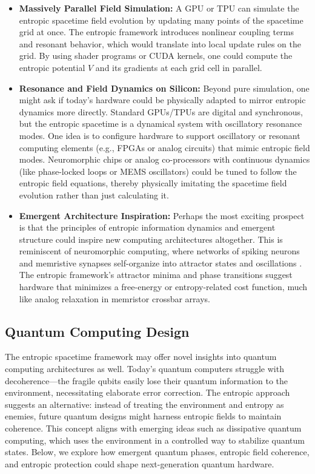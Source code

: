 \documentclass[11pt,a4paper]{article} %
\begin{document}
\begin{itemize}
  \item \textbf{Massively Parallel Field Simulation:} A GPU or TPU can simulate the entropic spacetime field evolution by updating many points of the spacetime grid at once. The entropic framework introduces nonlinear coupling terms and resonant behavior, which would translate into local update rules on the grid. By using shader programs or CUDA kernels, one could compute the entropic potential \(V\) and its gradients at each grid cell in parallel.
  
  \item \textbf{Resonance and Field Dynamics on Silicon:} Beyond pure simulation, one might ask if today’s hardware could be physically adapted to mirror entropic dynamics more directly. Standard GPUs/TPUs are digital and synchronous, but the entropic spacetime is a dynamical system with oscillatory resonance modes. One idea is to configure hardware to support oscillatory or resonant computing elements (e.g., FPGAs or analog circuits) that mimic entropic field modes. Neuromorphic chips or analog co-processors with continuous dynamics (like phase-locked loops or MEMS oscillators) could be tuned to follow the entropic field equations, thereby physically imitating the spacetime field evolution rather than just calculating it.
  
  \item \textbf{Emergent Architecture Inspiration:} Perhaps the most exciting prospect is that the principles of entropic information dynamics and emergent structure could inspire new computing architectures altogether. This is reminiscent of neuromorphic computing, where networks of spiking neurons and memristive synapses self-organize into attractor states and oscillations \cite{lanl-synapses}. The entropic framework’s attractor minima and phase transitions suggest hardware that minimizes a free-energy or entropy-related cost function, much like analog relaxation in memristor crossbar arrays.
\end{itemize}

\subsection{Quantum Computing Design}
The entropic spacetime framework may offer novel insights into quantum computing architectures as well. Today’s quantum computers struggle with decoherence—the fragile qubits easily lose their quantum information to the environment, necessitating elaborate error correction. The entropic approach suggests an alternative: instead of treating the environment and entropy as enemies, future quantum designs might harness entropic fields to maintain coherence. This concept aligns with emerging ideas such as dissipative quantum computing, which uses the environment in a controlled way to stabilize quantum states. Below, we explore how emergent quantum phases, entropic field coherence, and entropic protection could shape next-generation quantum hardware.
\end{document}
